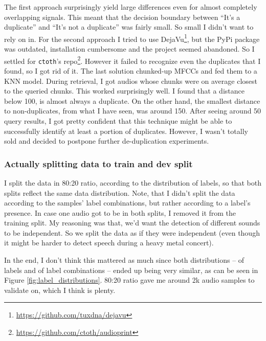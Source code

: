 \documentclass[11pt]{article}
\begin{document}
The first approach surprisingly yield large differences even for almost
completely overlapping signals. This meant that the decision boundary between
``It's a duplicate'' and ``It's not a duplicate'' was fairly small. So small I
didn't want to rely on in. For the second approach I tried to use
DejaVu\footnote{\url{https://github.com/tuxdna/dejavu}}, but the PyPi package
was outdated, installation cumbersome and the project seemed abandoned. So I
settled for \texttt{ctoth}'s
repo\footnote{\url{https://github.com/ctoth/audioprint}}. However it failed to
recognize even the duplicates that I found, so I got rid of it. The last
solution chunked-up MFCCs and fed them to a KNN model. During retrieval, I got
audios whose chunks were on average closest to the queried chunks. This worked
surprisingly well. I found that a distance below 100, is almost always a
duplicate. On the other hand, the smallest distance to non-duplicates, from
what I have seen, was around 150. After seeing around 50 query results, I got
pretty confident that this technique might be able to successfully identify at
least a portion of duplicates. However, I wasn't totally sold and decided to
postpone further de-duplication experiments.

\subsubsection{Actually splitting data to train and dev split}

I split the data in 80:20 ratio, according to the distribution of labels, so
that both splits reflect the same data distribution. Note, that I didn't split
the data according to the samples' label combinations, but rather according to
a label's presence. In case one audio got to be in both splits, I removed it
from the training split. My reasoning was that, we'd want the detection of
different sounds to be independent. So we split the data as if they were
independent (even though it might be harder to detect speech during a heavy
metal concert).

In the end, I don't think this mattered as much since both distributions -- of
labels and of label combinations -- ended up being very similar, as can be seen
in Figure \ref{fig:label_distributions}. 80:20 ratio gave me around 2k audio
samples to validate on, which I think is plenty.
\end{document}
